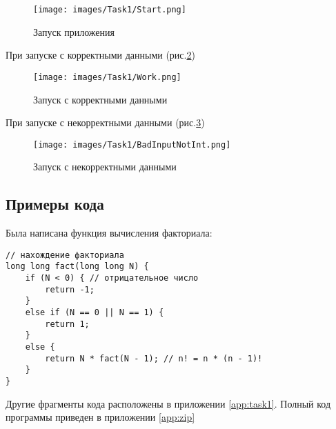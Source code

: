 \begin{figure}[!h]
    \centering
    \texttt{[image: images/Task1/Start.png]}
    \caption{Запуск приложения}
    \label{fig:StartForm1}
\end{figure}

При запуске с корректными данными (рис.\ref{fig:WorkForm1})

\begin{figure}[!h]
    \centering
    \texttt{[image: images/Task1/Work.png]}
    \caption{Запуск с корректными данными}
    \label{fig:WorkForm1}
\end{figure}

При запуске с некорректными данными (рис.\ref{fig:BadInputNotIntForm1})

\begin{figure}[!h]
    \centering
    \texttt{[image: images/Task1/BadInputNotInt.png]}
    \caption{Запуск с некорректными данными}
    \label{fig:BadInputNotIntForm1}
\end{figure}
\subsection{Примеры кода}

Была написана функция вычисления факториала:

\begin{verbatim}
// нахождение факториала
long long fact(long long N) {
	if (N < 0) { // отрицательное число 
		return -1;
	}
	else if (N == 0 || N == 1) {
		return 1;
	}
	else {
		return N * fact(N - 1); // n! = n * (n - 1)!
	}
}
\end{verbatim}

Другие фрагменты кода расположены в приложении \ref{app:task1}. Полный код программы приведен в приложении \ref{app:zip}
